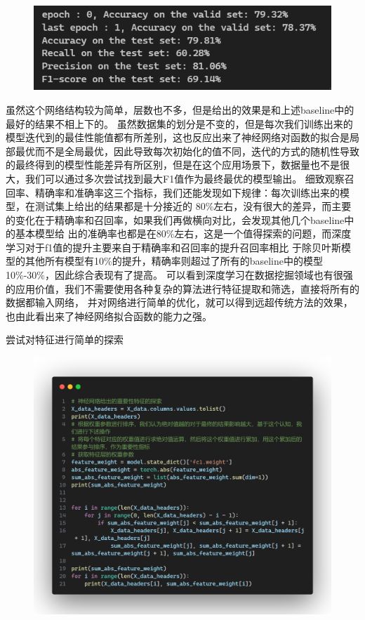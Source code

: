 \documentclass{article}
\begin{document}
\begin{figure}[H]
	\centering
	\includegraphics[width=\textwidth]{./img/my_mlp_res.png}
\end{figure}
虽然这个网络结构较为简单，层数也不多，但是给出的效果是和上述baseline中的最好的结果不相上下的。
虽然数据集的划分是不变的，但是每次我们训练出来的模型迭代到的最佳性能值都有所差别，这也反应出来了神经网络对函数的拟合是局部最优而不是全局最优，因此导致每次初始化的值不同，迭代的方式的随机性导致的最终得到的模型性能差异有所区别，但是在这个应用场景下，数据量也不是很大，我们可以通过多次尝试找到最大F1值作为最终最优的模型输出。
细致观察召回率、精确率和准确率这三个指标，我们还能发现如下规律：每次训练出来的模型，在测试集上给出的结果都是十分接近的
80\%左右，没有很大的差异，而主要的变化在于精确率和召回率，如果我们再做横向对比，会发现其他几个baseline中的基本模型给
出的准确率也都是在80\%左右，这是一个值得探索的问题，而深度学习对于f1值的提升主要来自于精确率和召回率的提升召回率相比
于除贝叶斯模型的其他所有模型有10\%的提升，精确率则超过了所有的baseline中的模型10\%-30\%，因此综合表现有了提高。
可以看到深度学习在数据挖掘领域也有很强的应用价值，我们不需要使用各种复杂的算法进行特征提取和筛选，直接将所有的数据都输入网络，
并对网络进行简单的优化，就可以得到远超传统方法的效果，也由此看出来了神经网络拟合函数的能力之强。


尝试对特征进行简单的探索

\begin{figure}[H]
	\centering
	\includegraphics[width=\textwidth]{./img/mlp_f.png}
\end{figure}
\end{document}
